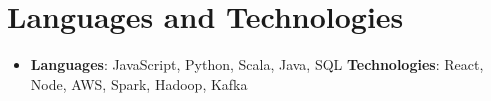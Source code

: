 \documentclass[letterpaper,11pt]{article}
\newcommand{\resumeSubHeadingListStart}{\begin{itemize}[leftmargin=*]}
\newcommand{\resumeSubHeadingListEnd}{\end{itemize}}
\begin{document}
\section{Languages and Technologies}
 \resumeSubHeadingListStart
   \item{
     \textbf{Languages}{: JavaScript, Python, Scala, Java, SQL}
     \hfill
     \textbf{Technologies}{: React, Node, AWS, Spark, Hadoop, Kafka}
   }
 \resumeSubHeadingListEnd


\end{document}
